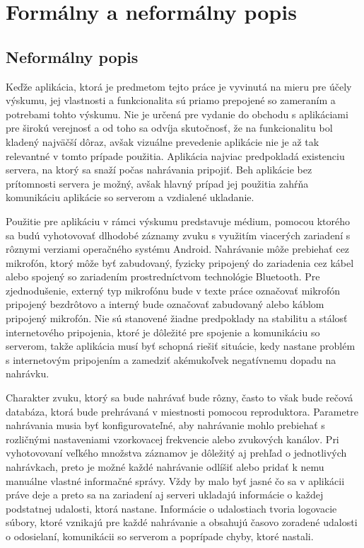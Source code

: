 \chapter{Formálny a neformálny popis}
\label{description}
\section{Neformálny popis}

Keďže aplikácia, ktorá je predmetom tejto práce je vyvinutá na mieru pre účely výskumu, jej vlastnosti a funkcionalita sú priamo prepojené so zameraním a potrebami tohto výskumu. Nie je určená pre vydanie do obchodu s aplikáciami pre širokú verejnosť a od toho sa odvíja skutočnosť, že na funkcionalitu bol kladený najväčší dôraz, avšak vizuálne prevedenie aplikácie nie je až tak relevantné v tomto prípade použitia. Aplikácia najviac predpokladá existenciu servera, na ktorý sa snaží počas nahrávania pripojiť. Beh aplikácie bez prítomnosti servera je možný, avšak hlavný prípad jej použitia zahŕňa komunikáciu aplikácie so serverom a vzdialené ukladanie.

Použitie pre aplikáciu v rámci výskumu predstavuje médium, pomocou ktorého sa budú vyhotovovať dlhodobé záznamy zvuku s využitím viacerých zariadení s rôznymi verziami operačného systému Android. Nahrávanie môže prebiehať cez mikrofón, ktorý môže byť zabudovaný, fyzicky pripojený do zariadenia cez kábel alebo spojený so zariadením prostredníctvom technológie Bluetooth. Pre zjednodušenie, externý typ mikrofónu bude v texte práce označovať mikrofón pripojený bezdrôtovo a interný bude označovať zabudovaný alebo káblom pripojený mikrofón. Nie sú stanovené žiadne predpoklady na stabilitu a stálosť internetového pripojenia, ktoré je dôležité pre spojenie a komunikáciu so serverom, takže aplikácia musí byť schopná riešiť situácie, kedy nastane problém s internetovým pripojením a zamedziť akémukoľvek negatívnemu dopadu na nahrávku. 

Charakter zvuku, ktorý sa bude nahrávať bude rôzny, často to však bude rečová databáza, ktorá bude prehrávaná v miestnosti pomocou reproduktora. Parametre nahrávania musia byť konfigurovateľné, aby nahrávanie mohlo prebiehať s rozličnými nastaveniami vzorkovacej frekvencie alebo zvukových kanálov. Pri vyhotovovaní veľkého množstva záznamov je dôležitý aj prehľad o jednotlivých nahrávkach, preto je možné každé nahrávanie odlíšiť alebo pridať k nemu manuálne vlastné informačné správy. Vždy by malo byť jasné čo sa v aplikácii práve deje a preto sa na zariadení aj serveri ukladajú informácie o každej podstatnej udalosti, ktorá nastane. Informácie o udalostiach tvoria logovacie súbory, ktoré vznikajú pre každé nahrávanie a obsahujú časovo zoradené udalosti o odosielaní, komunikácii so serverom a poprípade chyby, ktoré nastali.

